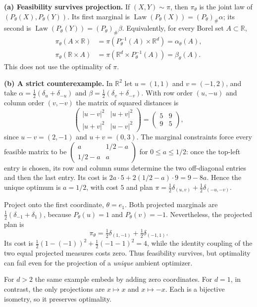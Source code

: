 \documentclass[11pt,a4paper]{article}
\theoremstyle{exostyle}
\newcommand{\R}{\mathbb{R}}
\newcommand{\push}{\#}
\DeclareMathOperator{\Law}{Law}
\begin{document}
\begin{solution}
\textbf{(a) Feasibility survives projection.}
If $(X,Y)\sim\pi$, then $\pi_\theta$ is the joint law of
$(P_\theta(X),P_\theta(Y))$. Its first marginal is
$\Law(P_\theta(X))=(P_\theta)_\push\alpha$; its second is
$\Law(P_\theta(Y))=(P_\theta)_\push\beta$. Equivalently, for every Borel
set $A\subset\R$,
\begin{align*}
  \pi_\theta(A\times\R)
    &=\pi(P_\theta^{-1}(A)\times\R^d)=\alpha_\theta(A),\\
  \pi_\theta(\R\times A)
    &=\pi(\R^d\times P_\theta^{-1}(A))=\beta_\theta(A).
\end{align*}
This does not use the optimality of $\pi$.

\textbf{(b) A strict counterexample.}
In $\R^2$ let $u=(1,1)$ and $v=(-1,2)$, and take
$\alpha=\tfrac12(\delta_u+\delta_{-u})$ and
$\beta=\tfrac12(\delta_v+\delta_{-v})$.
With row order $(u,-u)$ and column order $(v,-v)$ the matrix of squared
distances is
\[
  \begin{pmatrix}
    |u-v|^2 & |u+v|^2\\
    |u+v|^2 & |u-v|^2
  \end{pmatrix}
  =\begin{pmatrix}5&9\\9&5\end{pmatrix},
\]
since $u-v=(2,-1)$ and $u+v=(0,3)$.
The marginal constraints force every feasible matrix to be
$\left(\begin{smallmatrix}a&1/2-a\\1/2-a&a\end{smallmatrix}\right)$
for $0\leq a\leq1/2$: once the top-left entry is chosen, its row and
column sums determine the two off-diagonal entries and then the last
entry. Its cost is $2a\cdot5+2(1/2-a)\cdot9=9-8a$.
Hence the unique optimum is $a=1/2$, with cost $5$ and plan
$\pi=\tfrac12\delta_{(u,v)}+\tfrac12\delta_{(-u,-v)}$.

Project onto the first coordinate, $\theta=e_1$. Both projected
marginals are $\tfrac12(\delta_{-1}+\delta_1)$, because
$P_\theta(u)=1$ and $P_\theta(v)=-1$. Nevertheless, the projected plan is
\[
  \pi_\theta=\tfrac12\delta_{(1,-1)}+\tfrac12\delta_{(-1,1)}.
\]
Its cost is $\tfrac12(1-(-1))^2+\tfrac12(-1-1)^2=4$, while the identity
coupling of the two equal projected measures costs zero.
Thus feasibility survives, but optimality can fail even for the
projection of a \emph{unique} ambient optimizer.

For $d>2$ the same example embeds by adding zero coordinates. For $d=1$,
in contrast, the only projections are $x\mapsto x$ and $x\mapsto -x$.
Each is a bijective isometry, so it preserves optimality.


\end{solution}
\end{document}

